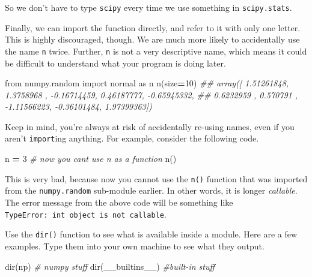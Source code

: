 \documentclass[
  12pt,
  krantz2]{krantz}
\makeatletter
\newenvironment{Shaded}{\begin{snugshade}}{\end{snugshade}}
\newcommand{\BuiltInTok}[1]{#1}
\newcommand{\CommentTok}[1]{\textcolor[rgb]{0.37,0.37,0.37}{\textit{#1}}}
\newcommand{\DecValTok}[1]{\textcolor[rgb]{0.06,0.06,0.06}{#1}}
\newcommand{\ImportTok}[1]{#1}
\newcommand{\NormalTok}[1]{#1}
\newcommand{\OperatorTok}[1]{\textcolor[rgb]{0.43,0.43,0.43}{\textbf{#1}}}
\newenvironment{kframe}{%
\medskip{}
\setlength{\fboxsep}{.8em}
 \def\at@end@of@kframe{}%
 \ifinner\ifhmode%
  \def\at@end@of@kframe{\end{minipage}}%
  \begin{minipage}{\columnwidth}%
 \fi\fi%
 \def\FrameCommand##1{\hskip\@totalleftmargin \hskip-\fboxsep
 \colorbox{shadecolor}{##1}\hskip-\fboxsep
     \hskip-\linewidth \hskip-\@totalleftmargin \hskip\columnwidth}%
 \MakeFramed {\advance\hsize-\width
   \@totalleftmargin\z@ \linewidth\hsize
   \@setminipage}}%
 {\par\unskip\endMakeFramed%
 \at@end@of@kframe}
\renewenvironment{Shaded}{\begin{kframe}}{\end{kframe}}
\makeatother
\begin{document}
So we don't have to type \texttt{scipy} every time we use something in \texttt{scipy.stats}.

Finally, we can import the function directly, and refer to it with only one letter. This is highly discouraged, though. We are much more likely to accidentally use the name \texttt{n} twice. Further, \texttt{n} is not a very descriptive name, which means it could be difficult to understand what your program is doing later.

\begin{Shaded}
\begin{Highlighting}[]
\ImportTok{from}\NormalTok{ numpy.random }\ImportTok{import}\NormalTok{ normal }\ImportTok{as}\NormalTok{ n}
\NormalTok{n(size}\OperatorTok{=}\DecValTok{10}\NormalTok{)}
\CommentTok{\#\# array([ 1.51261848,  1.3758968 , {-}0.16714459,  0.46187777, {-}0.65945332,}
\CommentTok{\#\#         0.6232959 ,  0.570791  , {-}1.11566223, {-}0.36101484,  1.97399363])}
\end{Highlighting}
\end{Shaded}

Keep in mind, you're always at risk of accidentally re-using names, even if you aren't \texttt{import}ing anything. For example, consider the following code.

\begin{Shaded}
\begin{Highlighting}[]
\NormalTok{n }\OperatorTok{=} \DecValTok{3} \CommentTok{\# now you can\textquotesingle{}t use n as a function }
\NormalTok{n()   }
\end{Highlighting}
\end{Shaded}

This is very bad, because now you cannot use the \texttt{n()} function that was imported from the \texttt{numpy.random} sub-module earlier. In other words, it is longer \emph{callable}. The error message from the above code will be something like \texttt{TypeError:\ \textquotesingle{}int\textquotesingle{}\ object\ is\ not\ callable}.

Use the \texttt{dir()} function to see what is available inside a module. Here are a few examples. Type them into your own machine to see what they output.

\begin{Shaded}
\begin{Highlighting}[]
\BuiltInTok{dir}\NormalTok{(np) }\CommentTok{\# numpy stuff}
\BuiltInTok{dir}\NormalTok{(\_\_builtins\_\_) }\CommentTok{\#built{-}in stuff}
\end{Highlighting}
\end{Shaded}
\end{document}
